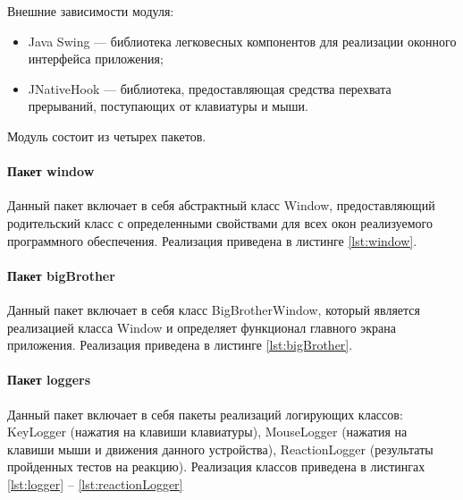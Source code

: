 Внешние зависимости модуля:

\begin{itemize}[leftmargin=1.6\parindent]
\item Java Swing \cite{swing} --- библиотека легковесных компонентов для реализации оконного интерфейса приложения;
\item JNativeHook \cite{jnativehook} --- библиотека, предоставляющая средства перехвата прерываний, поступающих от клавиатуры и мыши.
\end{itemize}

Модуль состоит из четырех пакетов.

\paragraph{Пакет window}
Данный пакет включает в себя абстрактный класс Window, предоставляющий родительский класс с определенными свойствами для всех окон реализуемого программного обеспечения. Реализация приведена в листинге \ref{lst:window}.



\paragraph{Пакет bigBrother}
Данный пакет включает в себя класс BigBrotherWindow, который является реализацией класса Window и определяет функционал главного экрана приложения. Реализация приведена в листинге \ref{lst:bigBrother}.



\paragraph{Пакет loggers}
Данный пакет включает в себя пакеты реализаций логирующих классов: KeyLogger (нажатия на клавиши клавиатуры), MouseLogger (нажатия на клавиши мыши и движения данного устройства), ReactionLogger (результаты пройденных тестов на реакцию). Реализация классов приведена в листингах \ref{lst:logger} -- \ref{lst:reactionLogger}



